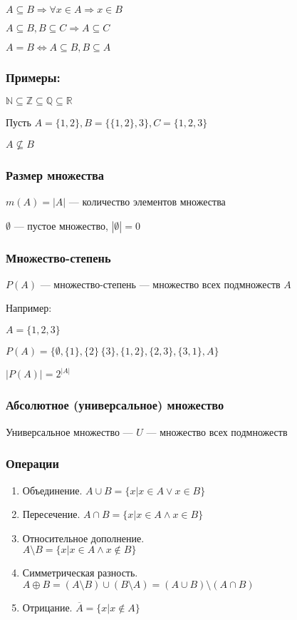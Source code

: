 \documentclass{article}
\begin{document}
$A \subseteq B \Rightarrow \forall x \in A \Rightarrow x \in B$

$A \subseteq B, B \subseteq C \Rightarrow A \subseteq C$

$A = B \Leftrightarrow A \subseteq B, B \subseteq A$

\subsubsection*{Примеры:}

$\mathbb{N} \subseteq \mathbb{Z} \subseteq \mathbb{Q} \subseteq \mathbb{R}$

Пусть $A = \{1, 2\}, B = \{\{1, 2\}, 3\}, C = \{1, 2, 3\}$

$A \not \subseteq B$

\subsubsection{Размер множества}

$m(A) = |A|$ --- количество элементов множества

$\emptyset$ --- пустое множество, $|\emptyset| = 0$

\subsubsection{Множество-степень}

$P(A)$ --- множество-степень --- множество всех подмножеств $A$

Например:

$A = \{1, 2, 3\}$

$P(A) = \{\emptyset, \{1\}, \{2\}\, \{3\}, \{1, 2\}, \{2, 3\}, \{3, 1\}, A\}$

$|P(A)| = 2^{|A|}$

\subsubsection{Абсолютное (универсальное) множество}

Универсальное множество --- $U$ --- множество всех подмножеств

\subsubsection{Операции}

\begin{enumerate}
	\item Объединение. $A \cup B = \{x | x \in A \lor x \in B\}$
	\item Пересечение. $A \cap B = \{x | x \in A \land x \in B\}$
	\item Относительное дополнение.\\
	$A \setminus B = \{x | x \in A \land x \not \in B\}$
	\item Симметрическая разность. $A \oplus B = (A \setminus B) \cup (B \setminus A) = (A \cup B) \setminus (A \cap B)$
	\item Отрицание. $\overline{A} = \{x | x \not \in A\}$
\end{enumerate}
\end{document}
